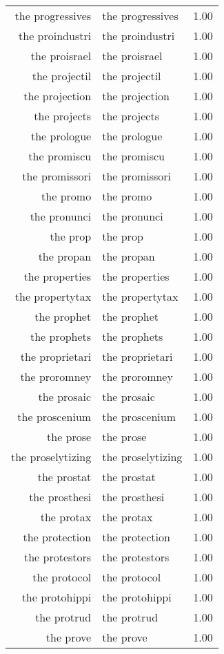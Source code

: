 \begin{table}[ht]
\begin{tabular}{rlr}
  the progressives & the progressives & 1.00 \\ 
  the proindustri & the proindustri & 1.00 \\ 
  the proisrael & the proisrael & 1.00 \\ 
  the projectil & the projectil & 1.00 \\ 
  the projection & the projection & 1.00 \\ 
  the projects & the projects & 1.00 \\ 
  the prologue & the prologue & 1.00 \\ 
  the promiscu & the promiscu & 1.00 \\ 
  the promissori & the promissori & 1.00 \\ 
  the promo & the promo & 1.00 \\ 
  the pronunci & the pronunci & 1.00 \\ 
  the prop & the prop & 1.00 \\ 
  the propan & the propan & 1.00 \\ 
  the properties & the properties & 1.00 \\ 
  the propertytax & the propertytax & 1.00 \\ 
  the prophet & the prophet & 1.00 \\ 
  the prophets & the prophets & 1.00 \\ 
  the proprietari & the proprietari & 1.00 \\ 
  the proromney & the proromney & 1.00 \\ 
  the prosaic & the prosaic & 1.00 \\ 
  the proscenium & the proscenium & 1.00 \\ 
  the prose & the prose & 1.00 \\ 
  the proselytizing & the proselytizing & 1.00 \\ 
  the prostat & the prostat & 1.00 \\ 
  the prosthesi & the prosthesi & 1.00 \\ 
  the protax & the protax & 1.00 \\ 
  the protection & the protection & 1.00 \\ 
  the protestors & the protestors & 1.00 \\ 
  the protocol & the protocol & 1.00 \\ 
  the protohippi & the protohippi & 1.00 \\ 
  the protrud & the protrud & 1.00 \\ 
  the prove & the prove & 1.00 \\ 

\end{tabular}
\end{table}
